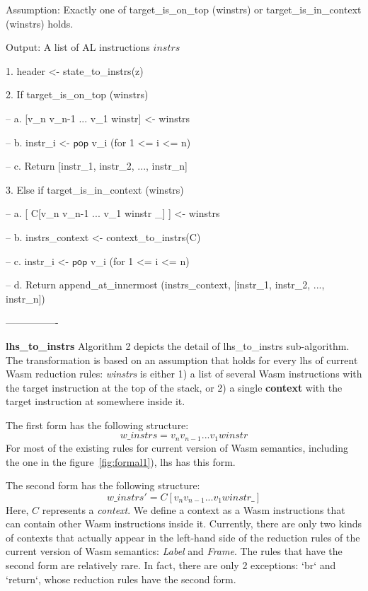 Assumption: Exactly one of target\_is\_on\_top (winstrs) or target\_is\_in\_context (winstrs) holds.

Output: A list of AL instructions $instrs$

1. header <- state\_to\_instrs(z)

2. If target\_is\_on\_top (winstrs)

-- a. [v\_n v\_n-1 ... v\_1 winstr] <- winstrs

-- b. instr\_i <- $\mathsf{pop}$ v\_i (for 1 <= i <= n)

-- c. Return [instr\_1, instr\_2, ..., instr\_n]

3. Else if target\_is\_in\_context (winstrs)

-- a. [ C[v\_n v\_n-1 ... v\_1 winstr \_] ] <- winstrs

-- b. instrs\_context <- context\_to\_instrs(C)

-- c. instr\_i <- $\mathsf{pop}$ v\_i (for 1 <= i <= n)

-- d. Return append\_at\_innermost (instrs\_context, [instr\_1, instr\_2, ..., instr\_n])

----------------

\textbf{lhs\_to\_instrs} Algorithm 2 depicts the detail of lhs\_to\_instrs sub-algorithm.
The transformation is based on an assumption that holds for every lhs of current Wasm reduction rules:
\textit{winstrs} is either 1) a list of several Wasm instructions with the target instruction at the top of the stack,
or 2) a single \textbf{context} with the target instruction at somewhere inside it.

The first form has the following structure:
\[
w\_instrs = v_n v_{n-1} ... v_1 winstr
\]
For most of the existing rules for current version of Wasm semantics, including the one in the figure~\ref{fig:formal1}),
lhs has this form.

The second form has the following structure:
\[
w\_instrs' = C[v_n v_{n-1} ... v_1 winstr \_]
\]
Here, $C$ represents a \textit{context}. We define a context as a Wasm instructions that
can contain other Wasm instructions inside it. Currently, there are only two kinds of
contexts that actually appear in the left-hand side of the reduction rules of the
current version of Wasm semantics: \textit{Label} and \textit{Frame}.
The rules that have the second form are relatively rare.
In fact, there are only 2 exceptions: `br` and `return`, whose reduction rules
have the second form.

